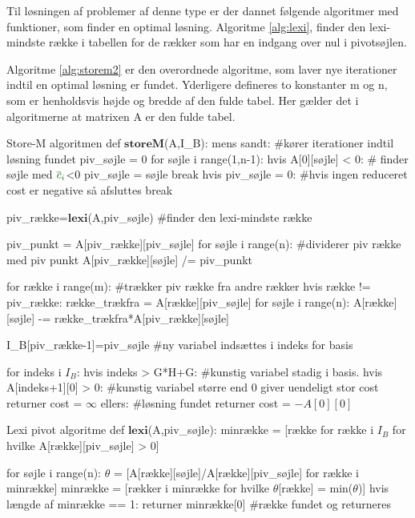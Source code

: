 Til løsningen af problemer af denne type er der dannet følgende algoritmer med funktioner, som finder en optimal løsning. Algoritme \ref{alg:lexi}, finder den lexi-mindste række i tabellen for de rækker som har en indgang over nul i pivotsøjlen. 

Algoritme \ref{alg:storem2} er den overordnede algoritme, som laver nye iterationer indtil en optimal løsning er fundet. Yderligere defineres to konstanter m og n, som er henholdsvis højde og bredde af den fulde tabel. Her gælder det i algoritmerne at matrixen A er den fulde tabel.

\newpage

\begin{alg}[label={alg:storem2}]{Store-M algoritmen}
def $\textbf{storeM}$(A,I_B):
    mens sandt: #kører iterationer indtil løsning fundet
    	piv_søjle = 0
    	for søjle i range(1,n-1): 
        	hvis A[0][søjle] < 0: # finder søjle med ${\color{commentgreen} \overline{c}_i}$<0
            	piv_søjle = søjle
            	break
		hvis piv_søjle = 0: #hvis ingen reduceret cost er negative så afsluttes
			break
            
    	piv_række=$\textbf{lexi}$(A,piv_søjle) #finder den lexi-mindste række
            
    	piv_punkt = A[piv_række][piv_søjle] 
    	for søjle i range(n): #dividerer piv række med piv punkt
        	A[piv_række][søjle] /= piv_punkt
            
    	for række i range(m): #trækker piv række fra andre rækker
        	hvis række != piv_række:
            	række_trækfra = A[række][piv_søjle]
            	for søjle i range(n):
                	A[række][søjle] -= række_trækfra*A[piv_række][søjle]

    	I_B[piv_række-1]=piv_søjle #ny variabel indsættes i indeks for basis

	for indeks i $I_B$: 
		hvis indeks > G*H+G: #kunstig variabel stadig i basis. 
			hvis A[indeks+1][0] > 0: #kunstig variabel større end 0 giver uendeligt stor cost
				returner cost = $\infty$
	ellers: #løsning fundet
		returner cost = $-A[0][0]$
\end{alg}

\begin{alg}[label={alg:lexi}]{Lexi pivot algoritme}
def $\textbf{lexi}$(A,piv_søjle):
	minrække = [række for række i $I_B$ for hvilke A[række][piv_søjle] > 0]
	
	for søjle i range(n):
		$\theta$ = [A[række][søjle]/A[række][piv_søjle] for række i minrække]
		minrække = [rækker i minrække for hvilke $\theta$[række] = min($\theta$)]
		hvis længde af minrække == 1:
			returner minrække[0] #række fundet og returneres
\end{alg}




